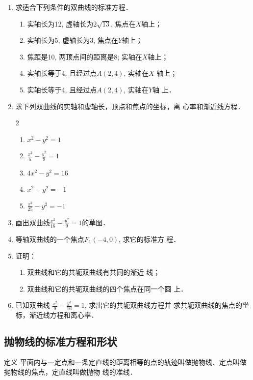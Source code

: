 \begin{ex}
\begin{enumerate}
    \item 求适合下列条件的双曲线的标准方程．
\begin{enumerate}
\item 实轴长为12, 虚轴长为$2\sqrt{13}$, 
    焦点在$X$轴上；
    \item 实轴长为5, 虚轴长为3, 焦点在$Y$轴上；
    \item 焦距是10, 两顶点间的距离是8; 
    实轴在$X$轴上；
    \item 实轴长等于4, 且经过点$A(2,4)$, 实轴在$X$
    轴上；
    \item 实轴长等于4, 且经过点$A(2,4)$, 实轴在$Y$轴
    上．
\end{enumerate}
\item 求下列双曲线的实轴和虚轴长，顶点和焦点的坐标，离
心率和渐近线方程．
\begin{multicols}{2}
\begin{enumerate}
    \item $x^2-y^2=1$
    \item $\frac{x^2}{5}-\frac{y^2}{9}=1$
    \item $4x^2-y^2=16$
    \item $x^2-y^2=-1$
    \item $\frac{x^2}{25}-y^2=-1$
\end{enumerate}
\end{multicols}

\item 画出双曲线$\frac{x^2}{16}-\frac{y^2}{9}=1$的草图．
\item 等轴双曲线的一个焦点$F_1(-4,0)$, 求它的标准方
程．
\item 证明：
\begin{enumerate}
\item 双曲线和它的共轭双曲线有共同的渐近
线；
\item 双曲线和它的共轭双曲线的四个焦点在同一个圆
上．
\end{enumerate}

\item 已知双曲线
$\frac{x^2}{9}-\frac{y^2}{16}=1$, 求出它的共轭双曲线方程并
求共轭双曲线的焦点的坐标，渐近线方程和离心率．
\end{enumerate}
\end{ex}

\subsection{抛物线的标准方程和形状}
\begin{blk}
   {定义}
平面内与一定点和一条定直线的距离相等的点的轨迹叫做抛物线．定点叫做抛物线的焦点，定直线叫做抛物
线的准线．
\end{blk}

